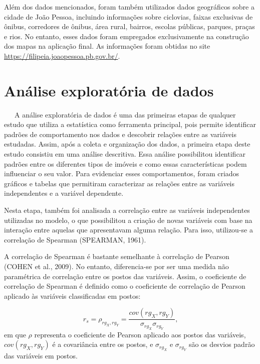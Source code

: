 \documentclass[
  12pt,
  a4paper,
]{scrreprt}
\begin{document}
\vspace{12pt}

Além dos dados mencionados, foram também utilizados dados geográficos
sobre a cidade de João Pessoa, incluindo informações sobre ciclovias,
faixas exclusivas de ônibus, corredores de ônibus, área rural, bairros,
escolas públicas, parques, praças e rios. No entanto, esses dados foram
empregados exclusivamente na construção dos mapas na aplicação final. As
informações foram obtidas no site
\url{https://filipeia.joaopessoa.pb.gov.br/}.

\section{Análise exploratória de
dados}\label{anuxe1lise-exploratuxf3ria-de-dados}

~~~A análise exploratória de dados é uma das primeiras etapas de
qualquer estudo que utiliza a estatística como ferramenta principal,
pois permite identificar padrões de comportamento nos dados e descobrir
relações entre as variáveis estudadas. Assim, após a coleta e
organização dos dados, a primeira etapa deste estudo consistiu em uma
análise descritiva. Essa análise possibilitou identificar padrões entre
os diferentes tipos de imóveis e como essas características podem
influenciar o seu valor. Para evidenciar esses comportamentos, foram
criados gráficos e tabelas que permitiram caracterizar as relações entre
as variáveis independentes e a variável dependente.

\vspace{12pt}

Nesta etapa, também foi analisada a correlação entre as variáveis
independentes utilizadas no modelo, o que possibilitou a criação de
novas variáveis com base na interação entre aquelas que apresentavam
alguma relação. Para isso, utilizou-se a correlação de Spearman
(SPEARMAN, 1961).

\vspace{12pt}

A correlação de Spearman é bastante semelhante à correlação de Pearson
(COHEN et al., 2009). No entanto, diferencia-se por ser uma medida não
paramétrica de correlação entre os postos das variáveis. Assim, o
coeficiente de correlação de Spearman é definido como o coeficiente de
correlação de Pearson aplicado às variáveis classificadas em postos:

\[
r_{s} = \rho_{rg_{X}, rg_{Y}} = \frac{cov\left(rg_{X}, rg_{Y}\right)}{\sigma_{rg_X}\sigma_{rg_Y}} \text{,}
\] em que \(\rho\) representa o coeficiente de Pearson aplicado aos
postos das variáveis, \(cov\left(rg_{X}, rg_{Y}\right)\) é a covariância
entre os postos, e \(\sigma_{rg_X}\) e \(\sigma_{rg_Y}\) são os desvios
padrão das variáveis em postos.
\end{document}
